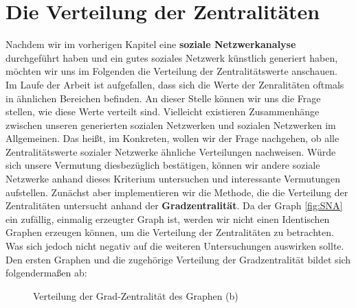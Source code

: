 \section{Die Verteilung der Zentralitäten}
Nachdem wir im vorherigen Kapitel eine \textbf{soziale Netzwerkanalyse} durchgeführt haben und ein gutes soziales Netzwerk künstlich generiert haben, möchten wir uns im Folgenden die Verteilung der Zentralitätswerte anschauen.
Im Laufe der Arbeit ist aufgefallen, dass sich die Werte der Zenralitäten oftmals in ähnlichen Bereichen befinden. An dieser Stelle können wir uns die Frage stellen, wie diese Werte verteilt sind. Vielleicht existieren Zusammenhänge zwischen unseren generierten sozialen Netzwerken und sozialen Netzwerken im Allgemeinen. Das heißt, im Konkreten, wollen wir der Frage nachgehen, ob alle Zentralitätswerte sozialer Netzwerke ähnliche Verteilungen nachweisen. Würde sich unsere Vermutung diesbezüglich bestätigen, können wir andere soziale Netzwerke anhand dieses Kriterium untersuchen und interessante Vermutungen aufstellen. Zunächst aber implementieren wir die Methode, die die Verteilung der Zentralitäten untersucht anhand der \textbf{Gradzentralität}.
Da der Graph \ref{fig:SNA} ein zufällig, einmalig erzeugter Graph ist, werden wir nicht einen Identischen Graphen erzeugen können, um die Verteilung der Zentralitäten zu betrachten. Was sich jedoch nicht negativ auf die weiteren Untersuchungen auswirken sollte. Den ersten Graphen und die zugehörige Verteilung der Gradzentralität bildet sich folgendermaßen ab: 

\FloatBarrier
\begin{figure}[h!]%
  \centering
  \qquad
  \caption{Verteilung der Grad-Zentralität des Graphen (b)}%
  \label{fig:distribution}
\end{figure}

